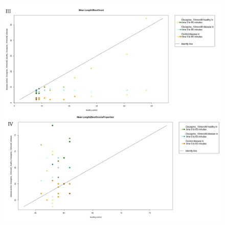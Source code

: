 \begin{figure}[h!]
\begin{center}
\includegraphics[width=15cm,height=16cm]{ApoLowCountScootsC.png}
\end{center}
\end{figure}
\newpage
